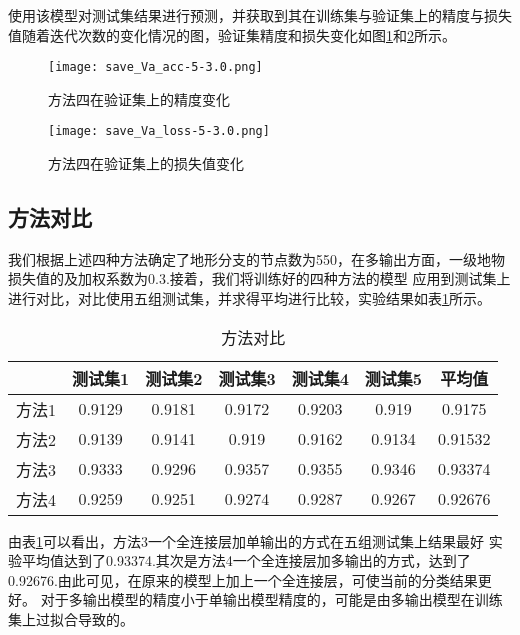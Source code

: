 \documentclass[lang=cn,11pt,a4paper,cite=authoryear]{elegantpaper}
\begin{document}
使用该模型对测试集结果进行预测，并获取到其在训练集与验证集上的精度与损失值随着迭代次数的变化情况的图，验证集精度和损失变化如图\ref{fig:val-acc4}和\ref{fig:val-loss4}所示。

\begin{figure}[!htb]
  \centering
  \texttt{[image: save\_Va\_acc-5-3.0.png]}
  \caption{方法四在验证集上的精度变化}
  \label{fig:val-acc4}
\end{figure}

\begin{figure}[!htb]
  \centering
  \texttt{[image: save\_Va\_loss-5-3.0.png]}
  \caption{方法四在验证集上的损失值变化}
  \label{fig:val-loss4}
\end{figure}


\subsection{方法对比}
我们根据上述四种方法确定了地形分支的节点数为550，在多输出方面，一级地物损失值的及加权系数为0.3.接着，我们将训练好的四种方法的模型
应用到测试集上进行对比，对比使用五组测试集，并求得平均进行比较，实验结果如表\ref{tab:table3}所示。
\begin{table}[htbp]
  \centering
  \caption{方法对比}
    \begin{tabular}{|c|c|c|c|c|c|c|}
    \toprule
          & 测试集1  & 测试集2  & 测试集3  & 测试集4  & 测试集5  & 平均值 \\
    \midrule
    方法1   & 0.9129 & 0.9181 & 0.9172 & 0.9203 & 0.919 & \cellcolor[rgb]{ 1,  .486,  .502}0.9175 \\
    \midrule
    方法2   & 0.9139 & 0.9141 & 0.919 & 0.9162 & 0.9134 & \cellcolor[rgb]{ 1,  .8,  .8}0.91532 \\
    \midrule
    方法3   & 0.9333 & 0.9296 & 0.9357 & 0.9355 & 0.9346 & \cellcolor[rgb]{ .753,  0,  0}0.93374 \\
    \midrule
    方法4   & 0.9259 & 0.9251 & 0.9274 & 0.9287 & 0.9267 & \cellcolor[rgb]{ 1,  0,  0}0.92676 \\
    \bottomrule
    \end{tabular}%
  \label{tab:table3}%
\end{table}%

由表\ref{tab:table3}可以看出，方法3一个全连接层加单输出的方式在五组测试集上结果最好
实验平均值达到了0.93374.其次是方法4一个全连接层加多输出的方式，达到了0.92676.由此可见，在原来的模型上加上一个全连接层，可使当前的分类结果更好。
对于多输出模型的精度小于单输出模型精度的，可能是由多输出模型在训练集上过拟合导致的。
\end{document}
